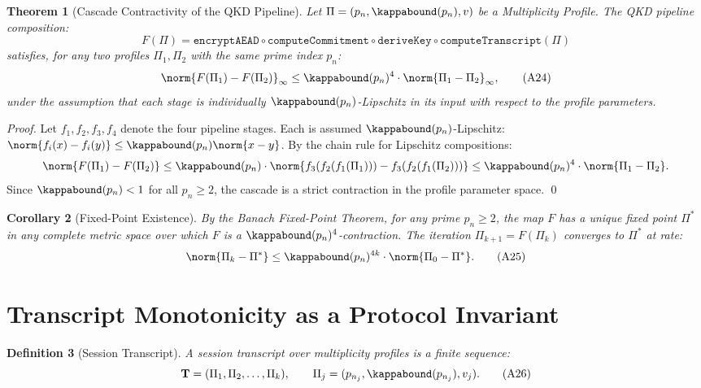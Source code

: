 \documentclass[11pt,letterpaper]{article}
\newtheorem{theorem}{Theorem}[section]
\newtheorem{definition}[theorem]{Definition}
\newtheorem{corollary}[theorem]{Corollary}
\theoremstyle{remark}
\begin{document}
\begin{theorem}[Cascade Contractivity of the QKD Pipeline]
\label{thm:qkd-cascade}
Let $\Pi = (p_n, \kappabound(p_n), v)$ be a Multiplicity Profile.
The QKD pipeline composition:
\[
  F(\Pi) = \texttt{encryptAEAD}\circ\texttt{computeCommitment}
           \circ\texttt{deriveKey}\circ\texttt{computeTranscript}(\Pi)
\]
satisfies, for any two profiles $\Pi_1, \Pi_2$ with the same prime index $p_n$:
\[
  \norm{F(\Pi_1) - F(\Pi_2)}_\infty
  \leq \kappabound(p_n)^4 \cdot \norm{\Pi_1 - \Pi_2}_\infty, \tag{A24}
\]
under the assumption that each stage is individually $\kappabound(p_n)$-Lipschitz
in its input with respect to the profile parameters.
\end{theorem}

\begin{proof}
Let $f_1, f_2, f_3, f_4$ denote the four pipeline stages.  Each is assumed
$\kappabound(p_n)$-Lipschitz:
$\norm{f_i(x) - f_i(y)} \leq \kappabound(p_n) \norm{x - y}$.
By the chain rule for Lipschitz compositions:
\[
  \norm{F(\Pi_1) - F(\Pi_2)}
  \leq \kappabound(p_n) \cdot \norm{f_3(f_2(f_1(\Pi_1))) - f_3(f_2(f_1(\Pi_2)))}
  \leq \kappabound(p_n)^4 \cdot \norm{\Pi_1 - \Pi_2}.
\]
Since $\kappabound(p_n) < 1$ for all $p_n \geq 2$, the cascade is a
strict contraction in the profile parameter space. \qed
\end{proof}

\begin{corollary}[Fixed-Point Existence]
\label{cor:fixed-point}
By the Banach Fixed-Point Theorem, for any prime $p_n \geq 2$, the map
$F$ has a unique fixed point $\Pi^*$ in any complete metric space over
which $F$ is a $\kappabound(p_n)^4$-contraction.  The iteration
$\Pi_{k+1} = F(\Pi_k)$ converges to $\Pi^*$ at rate:
\[
  \norm{\Pi_k - \Pi^*} \leq \kappabound(p_n)^{4k} \cdot \norm{\Pi_0 - \Pi^*}. \tag{A25}
\]
\end{corollary}

\section{Transcript Monotonicity as a Protocol Invariant}
\label{sec:monotonicity}

\begin{definition}[Session Transcript]
A \emph{session transcript} over multiplicity profiles is a finite sequence:
\[
  \mathbf{T} = (\Pi_1, \Pi_2, \ldots, \Pi_k), \qquad
  \Pi_j = (p_{n_j}, \kappabound(p_{n_j}), v_j). \tag{A26}
\]
\end{definition}
\end{document}
